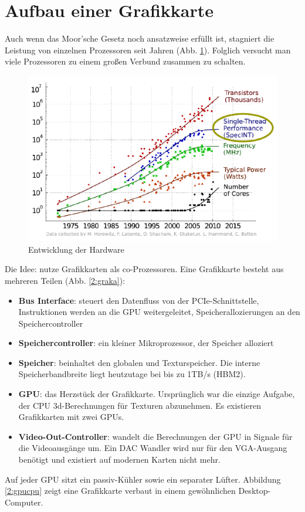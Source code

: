         \section{Aufbau einer Grafikkarte}
        Auch wenn das Moor'sche Gesetz noch ansatzweise erfüllt ist, stagniert die Leistung von einzelnen Prozessoren seit Jahren (Abb. \ref{2:hard}). Folglich versucht man viele Prozessoren zu einem großen Verbund zusammen zu schalten.
        
        \begin{figure}[h]
			\centering
    		    \includegraphics[height=0.6\textwidth]{chapter2/pictures/perf.png}
    		    \caption[Hardware]{Entwicklung der Hardware}
    		    \label{2:hard}
		\end{figure}

		Die Idee: nutze Grafikkarten als co-Prozessoren. Eine Grafikkarte besteht aus mehreren Teilen (Abb. \ref{2:graka}):
		\begin{itemize}
			\item \textbf{Bus Interface}: steuert den Datenfluss von der \Gls{PCIe}-Schnittstelle, Instruktionen werden an die GPU weitergeleitet, Speicherallozierungen an den Speichercontroller
			\item \textbf{Speichercontroller}: ein kleiner Mikroprozessor, der Speicher alloziert
			\item \textbf{Speicher}: beinhaltet den globalen und Texturspeicher. Die interne Speicherbandbreite liegt heutzutage bei bis zu 1TB/s (HBM2).
			\item \textbf{GPU}: das Herzstück der Grafikkarte. Ursprünglich war die einzige Aufgabe, der CPU 3d-Berechnungen für Texturen abzunehmen. Es existieren Grafikkarten mit zwei GPUs.
			\item \textbf{Video-Out-Controller}: wandelt die Berechnungen der GPU in Signale für die Videoausgänge um. Ein DAC Wandler wird nur für den VGA-Ausgang benötigt und existiert auf modernen Karten nicht mehr. 			
		\end{itemize}
		Auf jeder GPU sitzt ein passiv-Kühler sowie ein separater Lüfter. Abbildung \ref{2:gpucpu} zeigt eine Grafikkarte verbaut in einem gewöhnlichen Desktop-Computer. 
		
